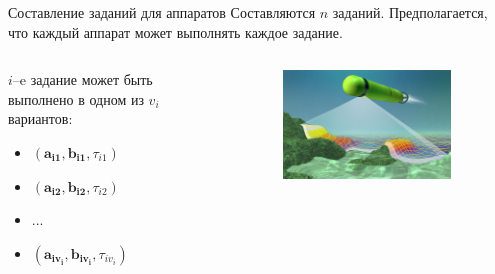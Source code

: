\documentclass{beamer}
\begin{document}
\begin{frame}{Составление заданий для аппаратов}
Составляются $n$ заданий. Предполагается, что каждый аппарат может выполнять каждое задание.
\begin{columns}[onlytextwidth, t]
    \begin{column}{0.6\textwidth}

        $i$--e задание может быть выполнено в одном из $v_i$ вариантов:
        \begin{itemize}
        \item $(\mathbf{a_{i 1}}, \mathbf{b_{i 1}}, \tau_{i 1})$
        \item $(\mathbf{a_{i 2}}, \mathbf{b_{i 2}}, \tau_{i 2})$
        \item $...$
        \item $(\mathbf{a_{i v_i}}, \mathbf{b_{i v_i}}, \tau_{i v_i})$
        \end{itemize}

    \end{column}
    \begin{column}{0.4\textwidth}
        \begin{figure}[here]
            \includegraphics[scale=0.4]{images/AUV5.JPG}
        \end{figure}
    \end{column}

​\end{columns}
\end{frame}
\end{document}
